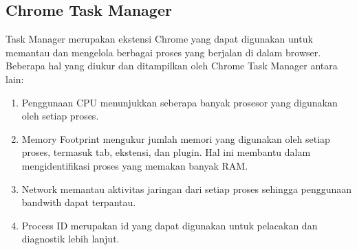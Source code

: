 \subsection{Chrome Task Manager}
Task Manager merupakan ekstensi Chrome yang dapat digunakan untuk memantau dan mengelola berbagai proses yang berjalan di dalam browser.  Beberapa hal yang diukur dan ditampilkan oleh Chrome Task Manager antara lain:
\begin{enumerate}
	\item Penggunaan CPU menunjukkan seberapa banyak prosesor yang digunakan oleh setiap proses. 
	\item Memory Footprint mengukur jumlah memori yang digunakan oleh setiap proses, termasuk tab, ekstensi, dan plugin. Hal ini membantu dalam mengidentifikasi proses yang memakan banyak RAM.
	\item Network memantau aktivitas jaringan dari setiap proses sehingga penggunaan bandwith dapat terpantau. 
	\item Process ID merupakan id yang dapat digunakan untuk pelacakan dan diagnostik lebih lanjut.
\end{enumerate}